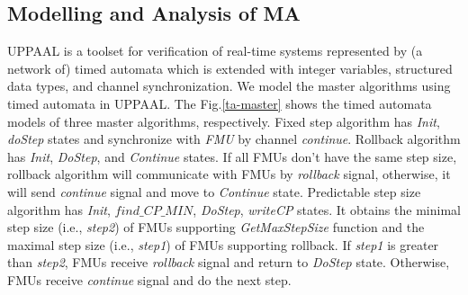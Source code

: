 \subsection{Modelling and Analysis of MA} 
UPPAAL \cite{BehrmannDLHPYH06} is a toolset for verification of real-time systems represented by (a network of) timed automata which is extended with integer variables, structured data types, and channel synchronization. We model the master algorithms using timed automata in UPPAAL. The Fig.\ref{ta-master} shows the timed automata models of three master algorithms,  respectively. Fixed step algorithm has \emph{Init}, \emph{doStep} states and synchronize with \emph{FMU} by channel \emph{continue}. Rollback algorithm has \emph{Init}, \emph{DoStep}, and \emph{Continue} states. If all FMUs don't have the same step size, rollback algorithm will communicate with FMUs by \emph{rollback} signal, otherwise, it will send \emph{continue} signal and move to \emph{Continue} state. Predictable step size algorithm has \emph{Init}, $find \_ CP \_ MIN$, \emph{DoStep}, \emph{writeCP} states. It obtains the minimal step size (i.e., \emph{step2}) of FMUs supporting \emph{GetMaxStepSize} function and the maximal step size (i.e., \emph{step1}) of FMUs supporting rollback. If \emph{step1} is greater than \emph{step2}, FMUs receive \emph{rollback} signal and return to \emph{DoStep} state. Otherwise, FMUs receive \emph{continue} signal and do the next step.  



\begin{figure}[htbp]
\end{figure}


